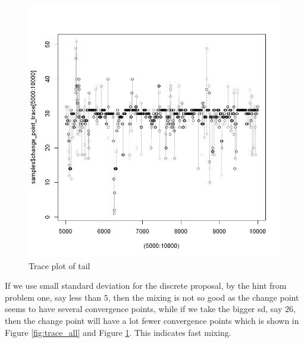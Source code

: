 \documentclass{article}
\begin{document}
\begin{enumerate}
\begin{figure}[H]
\begin{minipage}{0.5\textwidth}
        \includegraphics[width=\linewidth]{trace_tail.png}
        \caption{Trace plot of tail}
        \label{fig:trace_tail}
    \end{minipage}
\end{figure}
If we use small standard deviation for the discrete proposal, by the hint from problem one, say less than $5$, then the mixing is not so good as the change point seems to have several convergence points, while if we take the bigger sd, say $26$, then the change point will have a lot fewer convergence points which is shown in Figure \ref{fig:trace_all} and Figure \ref{fig:trace_tail}. This indicates fast mixing. 



\end{enumerate}
\end{document}
